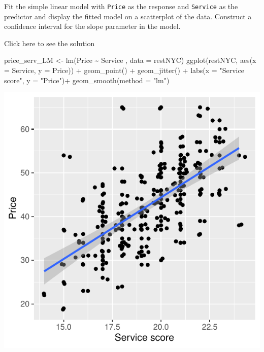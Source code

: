 \documentclass[
  letterpaper,
  DIV=11,
  numbers=noendperiod]{scrartcl}
\newenvironment{Shaded}{\begin{snugshade}}{\end{snugshade}}
\newcommand{\AttributeTok}[1]{\textcolor[rgb]{0.40,0.45,0.13}{#1}}
\newcommand{\FunctionTok}[1]{\textcolor[rgb]{0.28,0.35,0.67}{#1}}
\newcommand{\NormalTok}[1]{\textcolor[rgb]{0.00,0.23,0.31}{#1}}
\newcommand{\OtherTok}[1]{\textcolor[rgb]{0.00,0.23,0.31}{#1}}
\newcommand{\SpecialCharTok}[1]{\textcolor[rgb]{0.37,0.37,0.37}{#1}}
\newcommand{\StringTok}[1]{\textcolor[rgb]{0.13,0.47,0.30}{#1}}
\begin{document}
\begin{tcolorbox}[enhanced jigsaw, titlerule=0mm, colbacktitle=quarto-callout-warning-color!10!white, opacityback=0, left=2mm, rightrule=.15mm, toptitle=1mm, opacitybacktitle=0.6, colback=white, coltitle=black, breakable, bottomrule=.15mm, arc=.35mm, bottomtitle=1mm, title={Task 7}, toprule=.15mm, leftrule=.75mm, colframe=quarto-callout-warning-color-frame]

Fit the simple linear model with \texttt{Price} as the response and
\texttt{Service} as the predictor and display the fitted model on a
scatterplot of the data. Construct a confidence interval for the slope
parameter in the model.

Click here to see the solution

\begin{Shaded}
\begin{Highlighting}[]
\NormalTok{price\_serv\_LM }\OtherTok{\textless{}{-}} \FunctionTok{lm}\NormalTok{(Price  }\SpecialCharTok{\textasciitilde{}}\NormalTok{ Service  , }\AttributeTok{data =}\NormalTok{ restNYC)}
\FunctionTok{ggplot}\NormalTok{(restNYC, }\FunctionTok{aes}\NormalTok{(}\AttributeTok{x =}\NormalTok{ Service, }\AttributeTok{y =}\NormalTok{ Price)) }\SpecialCharTok{+}
  \FunctionTok{geom\_point}\NormalTok{() }\SpecialCharTok{+}
  \FunctionTok{geom\_jitter}\NormalTok{() }\SpecialCharTok{+}
  \FunctionTok{labs}\NormalTok{(}\AttributeTok{x =} \StringTok{"Service score"}\NormalTok{, }\AttributeTok{y =} \StringTok{"Price"}\NormalTok{)}\SpecialCharTok{+}
  \FunctionTok{geom\_smooth}\NormalTok{(}\AttributeTok{method =} \StringTok{"lm"}\NormalTok{)}
\end{Highlighting}
\end{Shaded}

\begin{center}
\includegraphics{about_files/figure-pdf/unnamed-chunk-10-1.pdf}
\end{center}


\end{tcolorbox}
\end{document}
